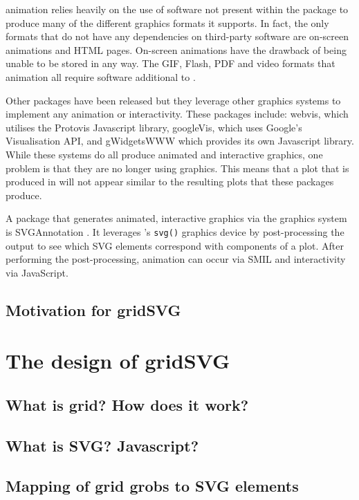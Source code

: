 \textsf{animation} relies heavily on the use of software not present within the package to produce many of the different graphics formats it supports.
In fact, the only formats that do not have any dependencies on third-party software are on-screen animations and HTML pages.
On-screen animations have the drawback of being unable to be stored in any way.
The GIF, Flash, PDF and video formats that \textsf{animation} all require software additional to \R{}.

Other packages have been released but they leverage other graphics systems to implement any animation or interactivity.
These packages include: \textsf{webvis}, which utilises the Protovis Javascript library, \textsf{googleVis}, which uses Google's Visualisation API, and \textsf{gWidgetsWWW} which provides its own Javascript library.
While these systems do all produce animated and interactive graphics, one problem is that they are no longer using \R{} graphics.
This means that a plot that is produced in \R{} will not appear similar to the resulting plots that these packages produce. 

A package that generates animated, interactive graphics via the \R{} graphics system is \textsf{SVGAnnotation} \citet{SVGAnnotation}.
It leverages \R{}'s \texttt{svg()} graphics device by post-processing the output to see which SVG elements correspond with components of a plot.
After performing the post-processing, animation can occur via SMIL and interactivity via JavaScript.

\section{Motivation for gridSVG}


\chapter{The design of gridSVG}

\section{What is grid? How does it work?}

\begin{center}
\end{center}

\section{What is SVG? Javascript?}

\section{Mapping of grid grobs to SVG elements}
